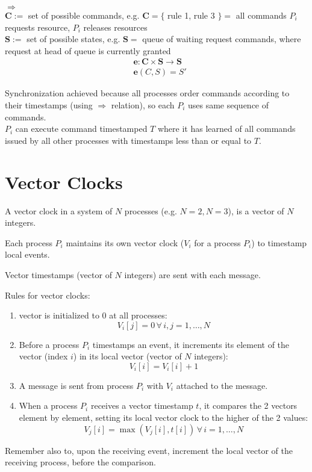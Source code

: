 \documentclass[10pt]{amsart}
\begin{document}
\begin{multicols*}{2}
$\Longrightarrow$ \\
$\mathbf{C} :=$ set of possible commands, e.g. $\mathbf{C} = \lbrace $ rule 1, rule 3 $\rbrace = $ all commands $P_i$ requests resource, $P_i$ releases resources \\
$\mathbf{S} :=$ set of possible states, e.g. $\mathbf{S} = $ queue of waiting request commands, where request at head of queue is currently granted \\

\[
\begin{aligned} 
& \mathbf{e} : \mathbf{C} \times \mathbf{S} \to \mathbf{S} \\
& \mathbf{e}(C, S) = S' 
\end{aligned}
\]

Synchronization achieved because all processes order commands according to their timestamps (using $\Longrightarrow$ relation), so each $P_i$ uses same sequence of commands. \\
$P_i$ can execute command timestamped $T$ where it has learned of all commands issued by all other processes with timestamps less than or equal to $T$.

\section{Vector Clocks}

A vector clock in a system of $N$ processes (e.g. $N=2, N=3$), is a vector of $N$ integers.

Each process $P_i$ maintains its own vector clock ($V_i$ for a process $P_i$) to timestamp local events.

Vector timestamps (vector of $N$ integers) are sent with each message. 

Rules for vector clocks:

\begin{enumerate}
	\item vector is initialized to 0 at all processes:
	\begin{equation}
	V_i[j] = 0 \, \forall \, i,j = 1, \dots , N
	\end{equation}
	\item Before a process $P_i$ timestamps an event, it increments its element of the vector (index $i$) in its local vector (vector of $N$ integers):
	\begin{equation}
		V_i[i] = V_i[i] + 1
	\end{equation}
	\item A message is sent from process $P_i$ with $V_i$ attached to the message.
	\item When a process $P_i$ receives a vector timestamp $t$, it compares the 2 vectors element by element, setting its local vector clock to the higher of the 2 values:
	\begin{equation}
		V_j[i] = \max{ (V_j[i], t[i])}  \, \forall \, i = 1, \dots, N
	\end{equation}
\end{enumerate}
Remember also to, upon the receiving event, increment the local vector of the receiving process, before the comparison.


\end{multicols*}
\end{document}
